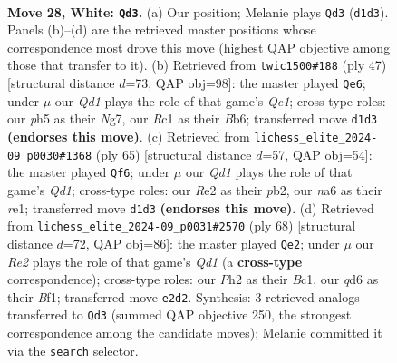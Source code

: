 \documentclass[11pt]{article}
\begin{document}
\begin{figure}[p]\centering
\begin{subfigure}{0.46\textwidth}\centering
\resizebox{\linewidth}{!}{%
\newchessgame
\chessboard[
  setfen={r1b5/pp4k1/n1pq2p1/6pp/3P4/PB3PP1/1P2R2P/2RQ2K1 w - - 2 28},
  showmover=false,
  pgfstyle=straightmove, color=movearrow, markmove={d1-d3}
]}
\caption{}
\end{subfigure}\hfill
\begin{subfigure}{0.46\textwidth}\centering
\resizebox{\linewidth}{!}{%
\newchessgame
\chessboard[
  setfen={4qrk1/2p2pn1/1b1p3p/4p1p1/2Q1P3/2PP1N1P/5PPB/5R1K b - - 6 24},
  showmover=false,
  pgfstyle=straightmove, color=movearrow, markmove={e8-e6}
]}
\caption{}
\end{subfigure}
\\[4pt]
\begin{subfigure}{0.46\textwidth}\centering
\resizebox{\linewidth}{!}{%
\newchessgame
\chessboard[
  setfen={3qr1k1/1pb2pp1/2p5/p2p1P2/P2P2Qp/2P1P3/1PB3K1/4R3 b - - 1 33},
  showmover=false,
  pgfstyle=straightmove, color=movearrow, markmove={d8-f6}
]}
\caption{}
\end{subfigure}\hfill
\begin{subfigure}{0.46\textwidth}\centering
\resizebox{\linewidth}{!}{%
\newchessgame
\chessboard[
  setfen={4r1k1/1b5p/p4pp1/2b1pq2/Pp5P/1P6/2PR1PP1/2BQ1BK1 w - - 1 35},
  showmover=false,
  pgfstyle=straightmove, color=movearrow, markmove={d1-e2}
]}
\caption{}
\end{subfigure}
\caption{\textbf{Move 28, White: \texttt{Qd3}.} (a) Our position; Melanie plays \texttt{Qd3} (\texttt{d1d3}). Panels (b)--(d) are the retrieved master positions whose correspondence most drove this move (highest QAP objective among those that transfer to it). (b) Retrieved from \texttt{twic1500\#188} (ply 47) [structural distance $d$=73, QAP obj=98]: the master played \texttt{Qe6}; under $\mu$ our \emph{Qd1} plays the role of that game's \emph{Qe1}; cross-type roles: our \emph{p}h5 as their \emph{N}g7, our \emph{R}c1 as their \emph{B}b6; transferred move \texttt{d1d3} \textbf{(endorses this move)}. (c) Retrieved from \texttt{lichess\_elite\_2024-09\_p0030\#1368} (ply 65) [structural distance $d$=57, QAP obj=54]: the master played \texttt{Qf6}; under $\mu$ our \emph{Qd1} plays the role of that game's \emph{Qd1}; cross-type roles: our \emph{R}e2 as their \emph{p}b2, our \emph{n}a6 as their \emph{r}e1; transferred move \texttt{d1d3} \textbf{(endorses this move)}. (d) Retrieved from \texttt{lichess\_elite\_2024-09\_p0031\#2570} (ply 68) [structural distance $d$=72, QAP obj=86]: the master played \texttt{Qe2}; under $\mu$ our \emph{Re2} plays the role of that game's \emph{Qd1} (a \textbf{cross-type} correspondence); cross-type roles: our \emph{P}h2 as their \emph{B}c1, our \emph{q}d6 as their \emph{B}f1; transferred move \texttt{e2d2}. Synthesis: 3 retrieved analogs transferred to \texttt{Qd3} (summed QAP objective 250, the strongest correspondence among the candidate moves); Melanie committed it via the \texttt{search} selector.}
\label{fig:thought-m54}
\end{figure}
\end{document}
